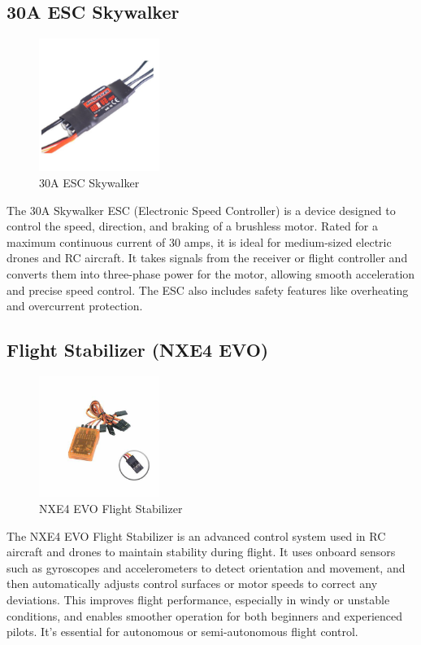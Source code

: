 \subsection{30A ESC Skywalker}
\begin{figure}[H]
\centering
\includegraphics[width=0.35\textwidth]{images/esc.jpg}
\caption{30A ESC Skywalker}
\end{figure}
The 30A Skywalker ESC (Electronic Speed Controller) is a device designed to control the speed, direction, and braking of a brushless motor. Rated for a maximum continuous current of 30 amps, it is ideal for medium-sized electric drones and RC aircraft. It takes signals from the receiver or flight controller and converts them into three-phase power for the motor, allowing smooth acceleration and precise speed control. The ESC also includes safety features like overheating and overcurrent protection.

\subsection{Flight Stabilizer (NXE4 EVO)}
\begin{figure}[H]
\centering
\includegraphics[width=0.35\textwidth]{images/Flight Stablizer.jpg}
\caption{NXE4 EVO Flight Stabilizer}
\end{figure}
The NXE4 EVO Flight Stabilizer is an advanced control system used in RC aircraft and drones to maintain stability during flight. It uses onboard sensors such as gyroscopes and accelerometers to detect orientation and movement, and then automatically adjusts control surfaces or motor speeds to correct any deviations. This improves flight performance, especially in windy or unstable conditions, and enables smoother operation for both beginners and experienced pilots. It's essential for autonomous or semi-autonomous flight control.

